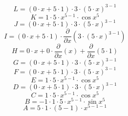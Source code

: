 \documentclass[12pt]{article}
\begin{document}
\begin{equation}
	L = 
\left( 0\cdot x + 5\cdot 1\right) \cdot 3\cdot \left( 5\cdot x\right) ^{3 - 1}
\end{equation}
\begin{equation}
	K = 
1\cdot 5\cdot x^{5 - 1}\cdot \cos {x^{5}}
\end{equation}
\begin{equation}
	J = 
\left( 0\cdot x + 5\cdot 1\right) \cdot 3\cdot \left( 5\cdot x\right) ^{3 - 1}
\end{equation}
\begin{equation}
	I = 
\left( 0\cdot x + 5\cdot 1\right) \cdot \frac{\partial}{\partial x}\left( 3\cdot \left( 5\cdot x\right) ^{3 - 1}\right) 
\end{equation}
\begin{equation}
	H = 
0\cdot x + 0\cdot \frac{\partial}{\partial x}\left( x\right)  + \frac{\partial}{\partial x}\left( 5\cdot 1\right) 
\end{equation}
\begin{equation}
	G = 
\left( 0\cdot x + 5\cdot 1\right) \cdot 3\cdot \left( 5\cdot x\right) ^{3 - 1}
\end{equation}
\begin{equation}
	F = 
\left( 0\cdot x + 5\cdot 1\right) \cdot 3\cdot \left( 5\cdot x\right) ^{3 - 1}
\end{equation}
\begin{equation}
	E = 
1\cdot 5\cdot x^{5 - 1}\cdot \cos {x^{5}}
\end{equation}
\begin{equation}
	D = 
\left( 0\cdot x + 5\cdot 1\right) \cdot 3\cdot \left( 5\cdot x\right) ^{3 - 1}
\end{equation}
\begin{equation}
	C = 
1\cdot 5\cdot x^{5 - 1}\cdot \cos {x^{5}}
\end{equation}
\begin{equation}
	B = 
-1\cdot 1\cdot 5\cdot x^{5 - 1}\cdot \sin {x^{5}}
\end{equation}
\begin{equation}
	A = 
5\cdot 1\cdot \left( 5 - 1\right) \cdot x^{5 - 1 - 1}
\end{equation}
\end{document}
